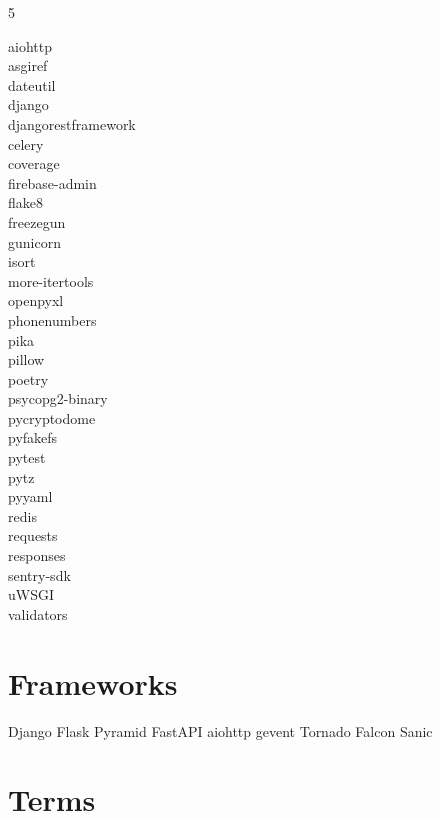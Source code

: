\documentclass [8pt] {extarticle}
\begin{document}
    \begin {multicols} {5}

    aiohttp \\
    asgiref \\
    dateutil \\
    django \\
    djangorestframework \\
    celery \\
    coverage \\
    firebase-admin \\
    flake8 \\
    freezegun \\
    gunicorn \\
    isort \\
    more-itertools \\
    openpyxl \\
    phonenumbers \\
    pika \\
    pillow \\
    poetry \\
    psycopg2-binary \\
    pycryptodome \\
    pyfakefs \\
    pytest \\
    pytz \\
    pyyaml \\
    redis \\
    requests \\
    responses \\
    sentry-sdk \\
    uWSGI \\
    validators \\

    \end {multicols}

    \section {Frameworks}

    Django \quad
    Flask \quad
    Pyramid \quad
    FastAPI \quad
    aiohttp \quad
    gevent \quad
    Tornado \quad
    Falcon \quad
    Sanic

    \pagebreak

    \section {Terms}
\end{document}
